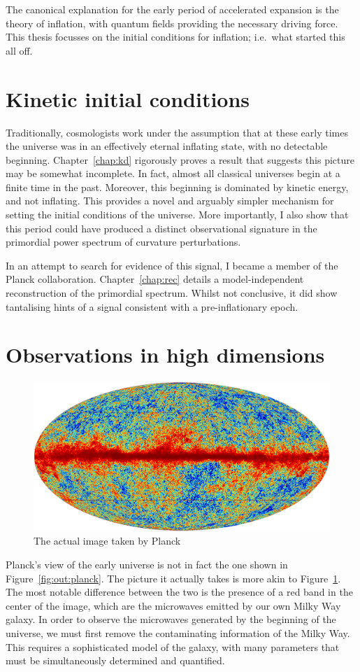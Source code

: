 The canonical explanation for the early period of accelerated expansion is the theory of inflation, with quantum fields providing the necessary driving force. This thesis focusses on the initial conditions for inflation; i.e.\ what started this all off.

\section{Kinetic initial conditions}

Traditionally, cosmologists work under the assumption that at these early times the universe was in an effectively eternal inflating state, with no detectable beginning. Chapter~\ref{chap:kd} rigorously proves a result that suggests this picture may be somewhat incomplete. In fact, almost all classical universes begin at a finite time in the past. Moreover, this beginning is dominated by kinetic energy, and not inflating. This provides a novel and arguably simpler mechanism for setting the initial conditions of the universe. More importantly, I also show that this period could have produced a distinct observational signature in the primordial power spectrum of curvature perturbations.

In an attempt to search for evidence of this signal, I became a member of the Planck collaboration. Chapter~\ref{chap:rec} details a model-independent reconstruction of the primordial spectrum. Whilst not conclusive, it did show tantalising hints of a signal consistent with a pre-inflationary epoch.

\section{Observations in high dimensions}
\begin{figure}[tp]
  \includegraphics[width=\textwidth]{chapters/outline/figures/planck_galaxy}
  \caption{The actual image taken by Planck}\label{fig:out:planck_galaxy}
\end{figure}
Planck's view of the early universe is not in fact the one shown in Figure~\ref{fig:out:planck}. The picture it actually takes is more akin to Figure~\ref{fig:out:planck_galaxy}. The most notable difference between the two is the presence of a red band in the center of the image, which are the microwaves emitted by our own Milky Way galaxy. In order to observe the microwaves generated by the beginning of the universe, we must first remove the contaminating information of the Milky Way. This requires a sophisticated model of the galaxy, with many parameters that must be simultaneously determined and quantified. 

